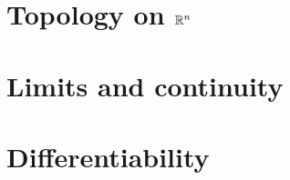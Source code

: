 \documentclass[12pt]{article}
\begin{document}
\section{Topology on \(\mathbb{R}^n\)}



\section{Limits and continuity}



\section{Differentiability}


\end{document}
